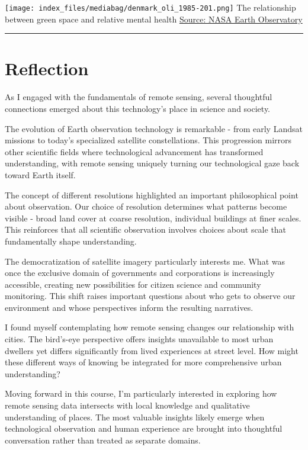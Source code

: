 \documentclass[
  letterpaper,
  DIV=11,
  numbers=noendperiod]{scrreprt}
\begin{document}
\texttt{[image: index\_files/mediabag/denmark\_oli\_1985-201.png]} The
relationship between green space and relative mental health
\href{https://earthobservatory.nasa.gov/images/145305/summer-heat-shifts-to-europe}{Source:
NASA Earth Observatory}

\begin{center}\rule{0.5\linewidth}{0.5pt}\end{center}

\section{Reflection}\label{reflection}

As I engaged with the fundamentals of remote sensing, several thoughtful
connections emerged about this technology's place in science and
society.

The evolution of Earth observation technology is remarkable - from early
Landsat missions to today's specialized satellite constellations. This
progression mirrors other scientific fields where technological
advancement has transformed understanding, with remote sensing uniquely
turning our technological gaze back toward Earth itself.

The concept of different resolutions highlighted an important
philosophical point about observation. Our choice of resolution
determines what patterns become visible - broad land cover at coarse
resolution, individual buildings at finer scales. This reinforces that
all scientific observation involves choices about scale that
fundamentally shape understanding.

The democratization of satellite imagery particularly interests me. What
was once the exclusive domain of governments and corporations is
increasingly accessible, creating new possibilities for citizen science
and community monitoring. This shift raises important questions about
who gets to observe our environment and whose perspectives inform the
resulting narratives.

I found myself contemplating how remote sensing changes our relationship
with cities. The bird's-eye perspective offers insights unavailable to
most urban dwellers yet differs significantly from lived experiences at
street level. How might these different ways of knowing be integrated
for more comprehensive urban understanding?

Moving forward in this course, I'm particularly interested in exploring
how remote sensing data intersects with local knowledge and qualitative
understanding of places. The most valuable insights likely emerge when
technological observation and human experience are brought into
thoughtful conversation rather than treated as separate domains.
\end{document}
